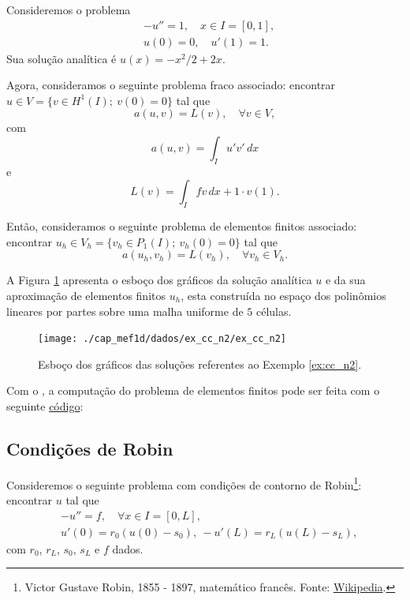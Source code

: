 \begin{ex}\label{ex:cc_n2}
  Consideremos o problema
  \begin{align}
    &-u'' = 1,\quad x\in I=[0,1],\label{eq:ex_cc_n2_eq}\\
    &u(0) = 0,\quad u'(1) = 1.\label{eq:ex_cc_n2_bc}
  \end{align}
Sua solução analítica é $u(x) = -x^2/2+2x$. 

Agora, consideramos o seguinte problema fraco associado: encontrar $u\in V=\{v\in H^1(I);~v(0)=0\}$ tal que
\begin{equation}
  a(u,v) = L(v),\quad\forall v\in V,
\end{equation}
com
\begin{equation}
  a(u, v) = \int_I u'v'\,dx
\end{equation}
e
\begin{equation}
  L(v) = \int_I fv\,dx + 1\cdot v(1).
\end{equation}

Então, consideramos o seguinte problema de elementos finitos associado: encontrar $u_h\in V_h = \{v_h\in P_1(I);~v_h(0)=0\}$ tal que
\begin{equation}
  a(u_h, v_h) = L(v_h),\quad\forall v_h\in V_h.
\end{equation}

A Figura \ref{fig:ex_cc_n2} apresenta o esboço dos gráficos da solução analítica $u$ e da sua aproximação de elementos finitos $u_h$, esta construída no espaço dos polinômios lineares por partes sobre uma malha uniforme de $5$ células.

\begin{figure}[h!]
  \centering
  \texttt{[image: ./cap\_mef1d/dados/ex\_cc\_n2/ex\_cc\_n2]}
  \caption{Esboço dos gráficos das soluções referentes ao Exemplo \ref{ex:cc_n2}.}
  \label{fig:ex_cc_n2}
\end{figure}

\ifispython
Com o \fenics, a computação do problema de elementos finitos pode ser feita com o seguinte \href{https://github.com/phkonzen/notas/blob/master/src/MetodoElementosFinitos/cap_mef1d/dados/ex_cc_n2/ex_cc_n2.py}{código}:

\fi
\end{ex} 

\subsection{Condições de Robin}

Consideremos o seguinte problema com condições de contorno de Robin\footnote{Victor Gustave Robin, 1855 - 1897, matemático francês. Fonte: \href{https://en.wikipedia.org/wiki/Victor_Robin}{Wikipedia}.}: encontrar $u$ tal que
\begin{align}
  &-u'' = f,\quad \forall x\in I=[0, L],\label{eq:cc_r_eq}\\
  &u'(0) = r_0(u(0)-s_0),~ -u'(L) = r_L(u(L)-s_L),\label{eq:cc_r_bc}
\end{align}
com $r_0$, $r_L$, $s_0$, $s_L$ e $f$ dados.

